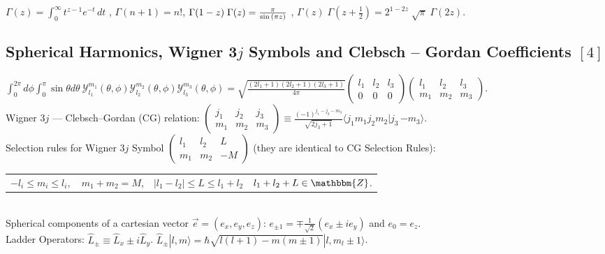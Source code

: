 \documentclass[10.5pt,letterpaper]{article}
\begin{document}
\noindent $\Gamma(z) = \int_0^\infty  t^{z-1} e^{-t}\,dt $ \space , \space $\Gamma(n+1)=n!$\space , \space $ \Gamma(1-z) \; \Gamma(z) = {\pi \over \sin{(\pi z)}} \,\! $ \space , \space  $\Gamma(z) \; \Gamma\left(z + \frac{1}{2}\right) = 2^{1-2z} \; \sqrt{\pi} \; \Gamma(2z). \,\! $


\subsection*{Spherical Harmonics, Wigner 3$j$ Symbols and Clebsch -- Gordan Coefficients $[4]$}
$\int_0^{2 \pi} d\phi \int_0^{\pi} \sin \theta d\theta \ \mathcal{Y}_{l_1}^{m_1}(\theta,\phi) \mathcal{Y}_{l_2}^{m_2}(\theta,\phi) \mathcal{Y}_{l_3}^{m_3}(\theta,\phi)=\sqrt{\frac{(2l_1+1)(2l_2+1)(2l_3+1)}{4 \pi}} \begin{pmatrix}
  l_1 & l_2 & l_3\\
  0 & 0 & 0
\end{pmatrix}
\begin{pmatrix}
  l_1 & l_2 & l_3\\
  m_1 & m_2 & m_3
\end{pmatrix}
$.
\\

\noindent Wigner 3$j$ --- Clebsch--Gordan (CG) relation:
$
\begin{pmatrix}
  j_1 & j_2 & j_3\\
  m_1 & m_2 & m_3
\end{pmatrix}
\equiv \frac{(-1)^{j_1-j_2-m_3}}{\sqrt{2j_3+1}} \langle j_1 m_1 j_2 m_2 | j_3 \, {-m_3} \rangle.$\\

\noindent Selection rules for Wigner 3$j$ Symbol $\begin{pmatrix}  l_1 & l_2 & L\\   m_1 & m_2 & -M \end{pmatrix}$ (they are identical to CG Selection Rules):

\noindent 
\begin{tabular}{llll}
$-l_i \leq m_i \leq l_i, $ & $m_1+m_2=M$, & $|l_1-l_2|\leqslant L \leqslant l_1+l_2$ & $l_1+l_2+L \in \mathbbm{Z}$.
\end{tabular}
\\

\noindent Spherical components of a cartesian vector $\vec e=(e_x,e_y,e_z)$: $e_{\pm 1}=\mp \frac{1}{\sqrt{2}} \left( e_x\pm i e_y \right)$ and $e_0=e_z$.\\

\noindent Ladder Operators: $ \hat L_{\pm}\equiv \hat L_x\pm i \hat L_y$. \space \space \space $\hat L_{\pm} |l,m \rangle=\hbar \sqrt{l(l+1)-m(m\pm1)}|l,m_l\pm1 \rangle$.
\end{document}
